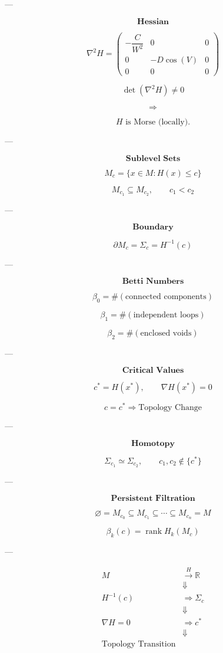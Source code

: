 \documentclass{article}
\begin{document}
---

\[
\textbf{Hessian}
\]

\[
\nabla^2H
=
\begin{pmatrix}
-\dfrac{C}{W^2} &0&0\\
0&-D\cos(V)&0\\
0&0&0
\end{pmatrix}
\]

\[
\det(\nabla^2H)\neq0
\]

\[
\Longrightarrow
\]

\[
H
\text{ is Morse (locally).}
\]

---

\[
\textbf{Sublevel Sets}
\]

\[
M_c
=
\{x\in M:H(x)\le c\}
\]

\[
M_{c_1}
\subseteq
M_{c_2},
\qquad
c_1<c_2
\]

---

\[
\textbf{Boundary}
\]

\[
\partial M_c
=
\Sigma_c
=
H^{-1}(c)
\]

---

\[
\textbf{Betti Numbers}
\]

\[
\beta_0
=
\#(\text{connected components})
\]

\[
\beta_1
=
\#(\text{independent loops})
\]

\[
\beta_2
=
\#(\text{enclosed voids})
\]

---

\[
\textbf{Critical Values}
\]

\[
c^\ast
=
H(x^\ast),
\qquad
\nabla H(x^\ast)=0
\]

\[
c=c^\ast
\Longrightarrow
\text{Topology Change}
\]

---

\[
\textbf{Homotopy}
\]

\[
\Sigma_{c_1}
\simeq
\Sigma_{c_2},
\qquad
c_1,c_2
\notin
\{c^\ast\}
\]

---

\[
\textbf{Persistent Filtration}
\]

\[
\varnothing
=
M_{c_0}
\subseteq
M_{c_1}
\subseteq
\cdots
\subseteq
M_{c_n}
=
M
\]

\[
\beta_k(c)
=
\operatorname{rank}
H_k(M_c)
\]

---

\[
\boxed{
\begin{aligned}
M
&\xrightarrow{\;H\;}
\mathbb{R}
\\
&
\Downarrow
\\
H^{-1}(c)
&\Longrightarrow
\Sigma_c
\\
&
\Downarrow
\\
\nabla H=0
&\Longrightarrow
c^\ast
\\
&
\Downarrow
\\
\text{Topology Transition}
\end{aligned}
}
\]
\end{document}
